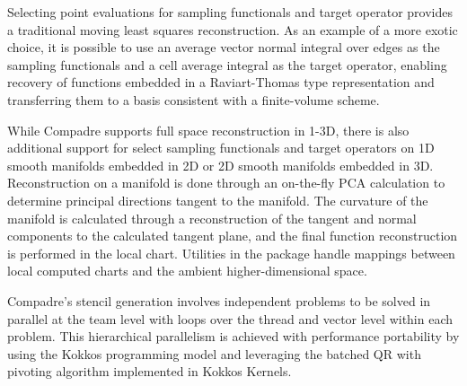 Selecting point evaluations for sampling functionals and target operator provides a traditional moving least squares reconstruction. As an example of a more exotic choice, it is possible to use an average vector normal integral over edges as the sampling functionals and a cell average integral as the target operator, enabling recovery of functions embedded in a Raviart-Thomas type representation and transferring them to a basis consistent with a finite-volume scheme.

While Compadre supports full space reconstruction in 1-3D, there is also additional support for select sampling functionals and target operators on 1D smooth manifolds embedded in 2D or 2D smooth manifolds embedded in 3D. Reconstruction on a manifold is done through an on-the-fly PCA calculation to determine principal directions tangent to the manifold. The curvature of the manifold is calculated through a reconstruction of the tangent and normal components to the calculated tangent plane, and the final function reconstruction is performed in the local chart. Utilities in the package handle mappings between local computed charts and the ambient higher-dimensional space.

Compadre's stencil generation involves independent problems to be solved in parallel at the team level with loops over the thread and vector level within each problem. This hierarchical parallelism is achieved with performance portability by using the Kokkos programming model and leveraging the batched QR with pivoting algorithm implemented in Kokkos Kernels.
